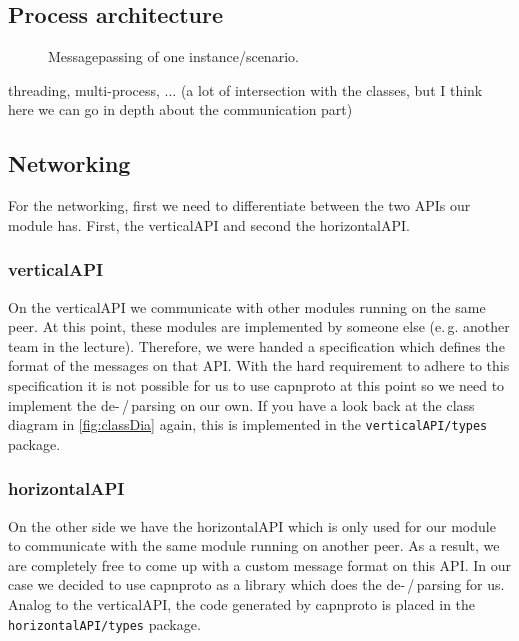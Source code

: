 \documentclass[a4paper,english,10pt,NET]{tumarticle}
\renewcommand{\eg}{\mbox{e.\,g.}\xspace} %
\begin{document}
\subsection{Process architecture} \label{sec:msgpassing}


\begin{figure}
	\centering
	
	\caption{Messagepassing of one instance/scenario.}
	\label{fig:msg}
\end{figure}

% 	

threading, multi-process, ... (a lot of intersection with the classes, but I think here we can go in depth about the communication part)

\subsection{Networking} \label{sec:structureNetworking}

For the networking, first we need to differentiate between the two APIs our module has.
First, the verticalAPI and second the horizontalAPI.

\subsubsection{verticalAPI}
On the verticalAPI we communicate with other modules running on the same peer.
At this point, these modules are implemented by someone else (\eg another team in the lecture).
Therefore, we were handed a specification which defines the format of the messages on that API.
With the hard requirement to adhere to this specification it is not possible for us to use capnproto at this point so we need to implement the de-\,/\,parsing on our own.
If you have a look back at the class diagram in \cref{fig:classDia} again, this is implemented in the \texttt{verticalAPI/types} package.

\subsubsection{horizontalAPI}
On the other side we have the horizontalAPI which is only used for our module to communicate with the same module running on another peer.
As a result, we are completely free to come up with a custom message format on this API.
In our case we decided to use capnproto as a library which does the de-\,/\,parsing for us.
Analog to the verticalAPI, the code generated by capnproto is placed in the \texttt{horizontalAPI/types} package.
\end{document}
